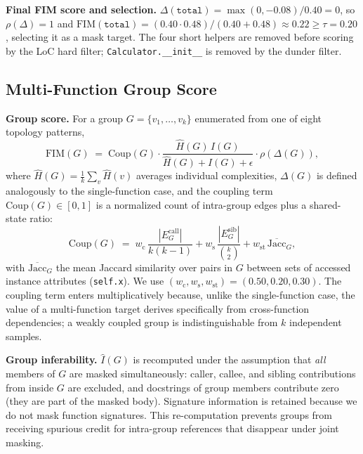 \textbf{Final FIM score and selection.}
$\Delta(\texttt{total})=\max(0,-0.08)/0.40=0$, so
$\rho(\Delta)=1$ and
$\mathrm{FIM}(\texttt{total})=(0.40\!\cdot\!0.48)/(0.40\!+\!0.48)\approx 0.22 \geq \tau\!=\!0.20$,
selecting it as a mask target. The four short helpers are removed before
scoring by the LoC hard filter; \texttt{Calculator.\_\_init\_\_} is
removed by the dunder filter.

\subsection{Multi-Function Group Score}
\label{app:algo:groups}

\textbf{Group score.}
For a group $G = \{v_1, \dots, v_k\}$ enumerated from one of eight
topology patterns,
\begin{equation}
  \mathrm{FIM}(G) \;=\;
  \mathrm{Coup}(G)
  \cdot
  \frac{\hat{H}(G)\,\hat{I}(G)}{\hat{H}(G) + \hat{I}(G) + \epsilon}
  \cdot
  \rho\!\left(\Delta(G)\right),
  \label{eq:fim_group}
\end{equation}
where $\hat{H}(G)=\tfrac{1}{k}\sum_v \hat{H}(v)$ averages individual
complexities, $\Delta(G)$ is defined analogously to the single-function
case, and the coupling term $\mathrm{Coup}(G)\in[0,1]$ is a normalized
count of intra-group edges plus a shared-state ratio:
\begin{equation}
  \mathrm{Coup}(G)
  \;=\; w_{\mathrm{c}}\,\frac{|E^{\text{call}}_G|}{k(k\!-\!1)}
   + w_{\mathrm{s}}\,\frac{|E^{\text{sib}}_G|}{\binom{k}{2}}
   + w_{\mathrm{st}}\,\overline{\mathrm{Jacc}}_G,
  \label{eq:coupling}
\end{equation}
with $\overline{\mathrm{Jacc}}_G$ the mean Jaccard similarity over pairs
in $G$ between sets of accessed instance attributes (\texttt{self.x}).
We use $(w_{\mathrm{c}}, w_{\mathrm{s}}, w_{\mathrm{st}}) = (0.50,
0.20, 0.30)$. The coupling term enters multiplicatively because, unlike
the single-function case, the value of a multi-function target derives
specifically from cross-function dependencies; a weakly coupled group
is indistinguishable from $k$ independent samples.

\textbf{Group inferability.}
$\hat{I}(G)$ is recomputed under the assumption that \emph{all} members
of $G$ are masked simultaneously: caller, callee, and sibling
contributions from inside $G$ are excluded, and docstrings of group
members contribute zero (they are part of the masked body). Signature
information is retained because we do not mask function signatures.
This re-computation prevents groups from receiving spurious credit for
intra-group references that disappear under joint masking.

